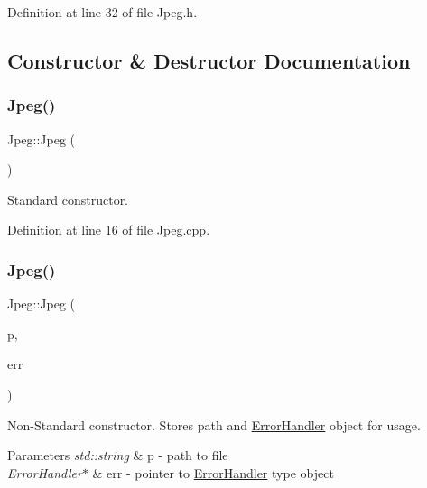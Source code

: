 Definition at line 32 of file Jpeg.\+h.



\subsection{Constructor \& Destructor Documentation}
\mbox{\label{classJpeg_aa6712899740d8d3d8789efe83aeeffac}} 
\subsubsection{\texorpdfstring{Jpeg()}{Jpeg()}\hspace{0.1cm}{\footnotesize\ttfamily [1/3]}}
{\footnotesize\ttfamily Jpeg\+::\+Jpeg (\begin{DoxyParamCaption}{ }\end{DoxyParamCaption})}



Standard constructor. 



Definition at line 16 of file Jpeg.\+cpp.

\mbox{\label{classJpeg_a8c226ee5074c5058b96b918b99e4a531}} 
\subsubsection{\texorpdfstring{Jpeg()}{Jpeg()}\hspace{0.1cm}{\footnotesize\ttfamily [2/3]}}
{\footnotesize\ttfamily Jpeg\+::\+Jpeg (\begin{DoxyParamCaption}\item[{std\+::string}]{p,  }\item[{\mbox{\hyperlink{classErrorHandler}{Error\+Handler}} $\ast$}]{err }\end{DoxyParamCaption})}



Non-\/\+Standard constructor. Stores path and \mbox{\hyperlink{classErrorHandler}{Error\+Handler}} object for usage. 


\begin{DoxyParams}{Parameters}
{\em std\+::string} & p -\/ path to file \\
\hline
{\em Error\+Handler$\ast$} & err -\/ pointer to \mbox{\hyperlink{classErrorHandler}{Error\+Handler}} type object \\
\hline
\end{DoxyParams}


